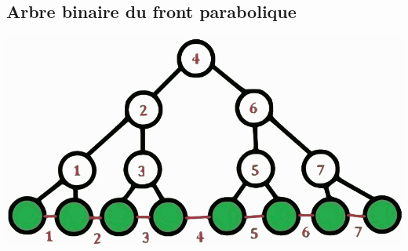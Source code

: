 \documentclass[a4paper, 10pt]{article}
\begin{document}
\begin{center}
\section*{Arbre binaire du front parabolique}
\includegraphics[scale=1]{../Rapport/ArbreBinaire-vect.pdf} 
\end{center}

\newpage
\end{document}
